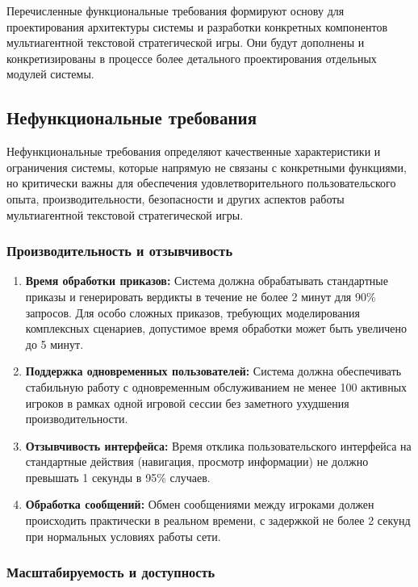 Перечисленные функциональные требования формируют основу для проектирования архитектуры системы и разработки конкретных компонентов мультиагентной текстовой стратегической игры. Они будут дополнены и конкретизированы в процессе более детального проектирования отдельных модулей системы.

\subsection{Нефункциональные требования}

Нефункциональные требования определяют качественные характеристики и ограничения системы, которые напрямую не связаны с конкретными функциями, но критически важны для обеспечения удовлетворительного пользовательского опыта, производительности, безопасности и других аспектов работы мультиагентной текстовой стратегической игры.

\subsubsection{Производительность и отзывчивость}

\begin{enumerate}[label=NFR\arabic*.]
    \item \textbf{Время обработки приказов:} Система должна обрабатывать стандартные приказы и генерировать вердикты в течение не более 2 минут для 90\% запросов. Для особо сложных приказов, требующих моделирования комплексных сценариев, допустимое время обработки может быть увеличено до 5 минут.

    \item \textbf{Поддержка одновременных пользователей:} Система должна обеспечивать стабильную работу с одновременным обслуживанием не менее 100 активных игроков в рамках одной игровой сессии без заметного ухудшения производительности.

    \item \textbf{Отзывчивость интерфейса:} Время отклика пользовательского интерфейса на стандартные действия (навигация, просмотр информации) не должно превышать 1 секунды в 95\% случаев.

    \item \textbf{Обработка сообщений:} Обмен сообщениями между игроками должен происходить практически в реальном времени, с задержкой не более 2 секунд при нормальных условиях работы сети.
\end{enumerate}

\subsubsection{Масштабируемость и доступность}

